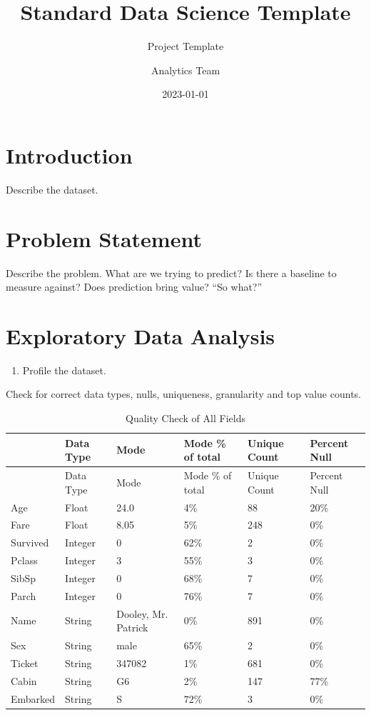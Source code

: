 \documentclass[
  letterpaper,
  DIV=11,
  numbers=noendperiod]{scrartcl}
\title{Standard Data Science Template}
\subtitle{Project Template}
\author{Analytics Team}
\date{2023-01-01}
\providecommand{\tightlist}{%
  \setlength{\itemsep}{0pt}\setlength{\parskip}{0pt}}\usepackage{longtable,booktabs,array}
\renewcommand*\contentsname{Table of contents}
\newcommand\contentsname{Table of contents}
\begin{document}
\maketitle

\renewcommand*\contentsname{Table of contents}
{
\hypersetup{linkcolor=}
\setcounter{tocdepth}{2}
\tableofcontents
}

\newpage{}

\section{Introduction}\label{introduction}

Describe the dataset.

\section{Problem Statement}\label{problem-statement}

Describe the problem. What are we trying to predict? Is there a baseline
to measure against? Does prediction bring value? ``So what?''

\section{Exploratory Data Analysis}\label{exploratory-data-analysis}

\begin{enumerate}
\def\labelenumi{\arabic{enumi}.}
\tightlist
\item
  Profile the dataset.
\end{enumerate}

Check for correct data types, nulls, uniqueness, granularity and top
value counts.

\begin{longtable}[]{@{}llllll@{}}
\caption{Quality Check of All Fields}\tabularnewline
\toprule\noalign{}
& Data Type & Mode & Mode \% of total & Unique Count & Percent Null \\
\midrule\noalign{}
\endfirsthead
\toprule\noalign{}
& Data Type & Mode & Mode \% of total & Unique Count & Percent Null \\
\midrule\noalign{}
\endhead
\bottomrule\noalign{}
\endlastfoot
Age & Float & 24.0 & 4\% & 88 & 20\% \\
Fare & Float & 8.05 & 5\% & 248 & 0\% \\
Survived & Integer & 0 & 62\% & 2 & 0\% \\
Pclass & Integer & 3 & 55\% & 3 & 0\% \\
SibSp & Integer & 0 & 68\% & 7 & 0\% \\
Parch & Integer & 0 & 76\% & 7 & 0\% \\
Name & String & Dooley, Mr. Patrick & 0\% & 891 & 0\% \\
Sex & String & male & 65\% & 2 & 0\% \\
Ticket & String & 347082 & 1\% & 681 & 0\% \\
Cabin & String & G6 & 2\% & 147 & 77\% \\
Embarked & String & S & 72\% & 3 & 0\% \\
\end{longtable}
\end{document}
